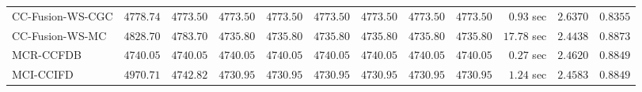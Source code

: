 \begin{table}[H]
\begin{tabular}{lrrrrrrrrrrr}
    CC-Fusion-WS-CGC & $      4778.74$ & $      4773.50$ & $      4773.50$ & $      4773.50$ & $      4773.50$ & $      4773.50$ & $      4773.50$ & $      4773.50$ & $         0.93$ sec    & $       2.6370$  & $       0.8355$ \\ 
     CC-Fusion-WS-MC & $      4828.70$ & $      4783.70$ & $      4735.80$ & $      4735.80$ & $      4735.80$ & $      4735.80$ & $      4735.80$ & $      4735.80$ & $        17.78$ sec    & $       2.4438$  & $       0.8873$ \\ 
\cmidrule{1-1} 
           MCR-CCFDB & $      4740.05$ & $      4740.05$ & $      4740.05$ & $      4740.05$ & $      4740.05$ & $      4740.05$ & $      4740.05$ & $      4740.05$ & $         0.27$ sec    & $       2.4620$  & $       0.8849$ \\ 
\cmidrule{1-1} 
           MCI-CCIFD & $      4970.71$ & $      4742.82$ & $      4730.95$ & $      4730.95$ & $      4730.95$ & $      4730.95$ & $      4730.95$ & $      4730.95$ & $         1.24$ sec    & $       2.4583$  & $       0.8849$ \\ 
\bottomrule
\end{tabular}
\end{table}

